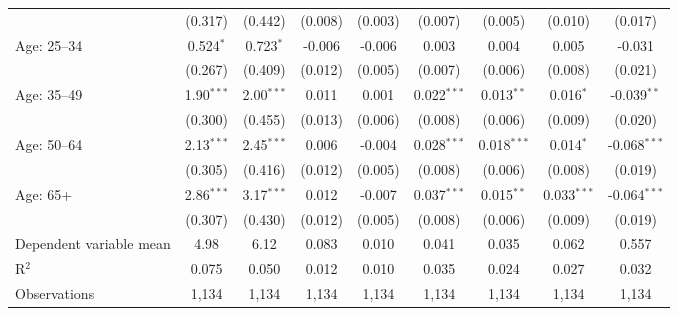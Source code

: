 \begin{table}[htbp]
\begin{adjustbox}{max width=\textwidth}
\begin{tabular}{lcccccccc}
 & (0.317) & (0.442) & (0.008) & (0.003) & (0.007) & (0.005) & (0.010) & (0.017) \\
Age: 25--34 & 0.524$^{*}$ & 0.723$^{*}$ & -0.006 & -0.006 & 0.003 & 0.004 & 0.005 & -0.031 \\
 & (0.267) & (0.409) & (0.012) & (0.005) & (0.007) & (0.006) & (0.008) & (0.021) \\
Age: 35--49 & 1.90$^{***}$ & 2.00$^{***}$ & 0.011 & 0.001 & 0.022$^{***}$ & 0.013$^{**}$ & 0.016$^{*}$ & -0.039$^{**}$ \\
 & (0.300) & (0.455) & (0.013) & (0.006) & (0.008) & (0.006) & (0.009) & (0.020) \\
Age: 50--64 & 2.13$^{***}$ & 2.45$^{***}$ & 0.006 & -0.004 & 0.028$^{***}$ & 0.018$^{***}$ & 0.014$^{*}$ & -0.068$^{***}$ \\
 & (0.305) & (0.416) & (0.012) & (0.005) & (0.008) & (0.006) & (0.008) & (0.019) \\
Age: 65+ & 2.86$^{***}$ & 3.17$^{***}$ & 0.012 & -0.007 & 0.037$^{***}$ & 0.015$^{**}$ & 0.033$^{***}$ & -0.064$^{***}$ \\
 & (0.307) & (0.430) & (0.012) & (0.005) & (0.008) & (0.006) & (0.009) & (0.019) \\
Dependent variable mean & 4.98 & 6.12 & 0.083 & 0.010 & 0.041 & 0.035 & 0.062 & 0.557 \\
R$^2$ & 0.075 & 0.050 & 0.012 & 0.010 & 0.035 & 0.024 & 0.027 & 0.032 \\
Observations & 1,134 & 1,134 & 1,134 & 1,134 & 1,134 & 1,134 & 1,134 & 1,134 \\
\bottomrule
\end{tabular}
\end{adjustbox}
\end{table}
